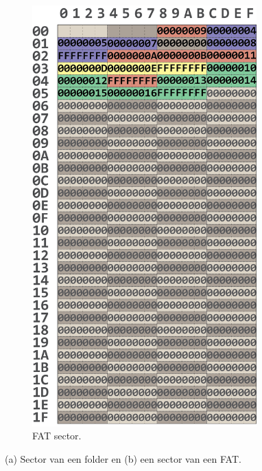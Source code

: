 \begin{figure}[h!]
\begin{subfigure}[t]{0.4\textwidth}
        \includegraphics[width=0.95\textwidth]{img/fat32-voorbeeld.png}
        \caption{FAT sector.}
        \label{fig:fat-example}
    \end{subfigure}
    \caption{(a) Sector van een folder en (b) een sector van een FAT.}
\end{figure}


